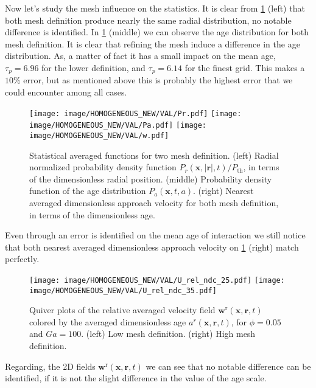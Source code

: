 Now let's study the mesh influence on the statistics. 
It is clear from \ref{fig:apstat} (left) that both mesh definition produce nearly the same radial distribution, no notable difference is identified. 
In \ref{fig:apstat} (middle) we can observe the age distribution for both mesh definition. 
It is clear that refining the mesh induce a difference in the age distribution. 
As, a matter of fact it has a small impact on the mean age, $\tau_p = 6.96$ for the lower definition, and $\tau_p = 6.14$ for the finest grid.
This makes a $10\%$ error, but as mentioned above this is probably the highest error that we could encounter among all cases. 
\begin{figure}
    \centering
    \texttt{[image: image/HOMOGENEOUS\_NEW/VAL/Pr.pdf]}
    \texttt{[image: image/HOMOGENEOUS\_NEW/VAL/Pa.pdf]}
    \texttt{[image: image/HOMOGENEOUS\_NEW/VAL/w.pdf]}
    \caption{
        Statistical averaged functions for two mesh definition. 
        (left) Radial normalized probability density function  $P_r(\textbf{x},|\textbf{r}|,t)/P_\text{th}$, in terms of the dimensionless radial position. 
        (middle) Probability density function of the age distribution $P_a(\textbf{x},t,a)$. 
        (right) Nearest averaged dimensionless approach velocity for both mesh definition, in terms of the dimensionless age. 
    }
    \label{fig:apstat}
\end{figure}
Even through an error is identified on the mean age of interaction we still notice that both nearest averaged dimensionless approach velocity on \ref{fig:apstat} (right) match perfectly. 
\begin{figure}[h!]
    \centering
    \texttt{[image: image/HOMOGENEOUS\_NEW/VAL/U\_rel\_ndc\_25.pdf]}
    \texttt{[image: image/HOMOGENEOUS\_NEW/VAL/U\_rel\_ndc\_35.pdf]}
    \caption{Quiver plots of the relative averaged velocity field $\textbf{w}^\text{r}(\textbf{x},\textbf{r},t)$ colored by the averaged dimensionless age $a^r(\textbf{x},\textbf{r},t)$, for $\phi = 0.05$ and $Ga = 100$. 
    (left) Low mesh definition.
    (right) High mesh definition. 
    }
    \label{fig:velap}
\end{figure}
Regarding, the 2D fields  $\textbf{w}^\text{r}(\textbf{x},\textbf{r},t)$ we can see that no notable difference can be identified, if it is not the slight difference in the value of the age scale. 


